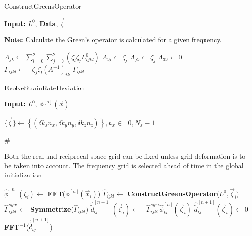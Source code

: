 \documentclass[11pt]{article}
\newcommand{\AlgoInput}{\textbf{Input: }}
\newcommand\LONGCOMMENT[1]{%
  \hfill\#\ \begin{minipage}[t]{\eqboxwidth{COMMENT}}#1\strut\end{minipage}%
}
\begin{document}
\begin{algorithm}
\caption{ConstructGreensOperator}
\AlgoInput{ $ L^0 $, \textbf{Data}, $ \vec{\zeta} $ }

\textbf{Note: }  Calculate the Green's operator is calculated for a given frequency.

\label{Algo:ConstructGreensOperator}
\begin{algorithmic}
%
%
%

\STATE  $ A_{jk} \leftarrow \sum_{l = 0}^{2} \sum_{j = 0}^{2} \left( \zeta_l \zeta_j L^0_{ijkl} \right) $
\STATE  $ A_{3j} \leftarrow \zeta_j $
\STATE  $ A_{j3} \leftarrow \zeta_j $
\STATE  $ A_{33} \leftarrow 0 $
\STATE  $ \Gamma_{ijkl} \leftarrow - \zeta_j \zeta_l (A^{-1})_{ik} $ 
\RETURN $ \Gamma_{ijkl} $
\end{algorithmic}
\end{algorithm}

\begin{algorithm}
\caption{EvolveStrainRateDeviation}
\AlgoInput{ $ L^0 $, $ \phi^{[n]}(\vec{x}) $}

\label{Algo:EvolveStrainRateDeviation}
\begin{algorithmic}
\STATE $ \{ \vec{\zeta} \} \leftarrow \left\{ \left( \delta k_x n_x, \delta k_y n_y, \delta k_z n_z \right ) \right \}, n_x \in [0, N_x-1]$ 


\LONGCOMMENT{Both the real and reciprocal space grid can be fixed unless grid deformation is to be taken into account.  The frequency grid is selected ahead of time in the global initialization.}
\STATE $\hat{\phi}^{[n]}( \zeta_i) \leftarrow $ \textbf{FFT}($ \phi^{[n]}( \vec{x}_i ) $)
\STATE $ \hat{ \Gamma}_{ijkl}  \leftarrow$ \textbf{ConstructGreensOperator}($ L^0, \vec{\zeta}_i $)
\STATE $ \hat{ \Gamma}_{ijkl}^{sym} \leftarrow $ \textbf{Symmetrize}($ \hat{ \Gamma}_{ijkl}   $)
\STATE $ \hat{\tilde{d}}^{[n+1]}_{ij}(\vec{\zeta}_i) \leftarrow - \hat{ \Gamma}_{ijkl} ^{sym} \hat{\phi}^{[n]}_{kl}(\vec{\zeta}_i) $
\ELSE
\STATE $ \hat{\tilde{d}}^{[n+1]}_{ij}(\vec{\zeta}_i) \leftarrow 0$
\ENDIF
\ENDFOR
\RETURN \textbf{FFT}$ ^{-1} $($\hat{\tilde{d}}^{[n+1]}_{ij} $)
\end{algorithmic}
\end{algorithm}
\end{document}
